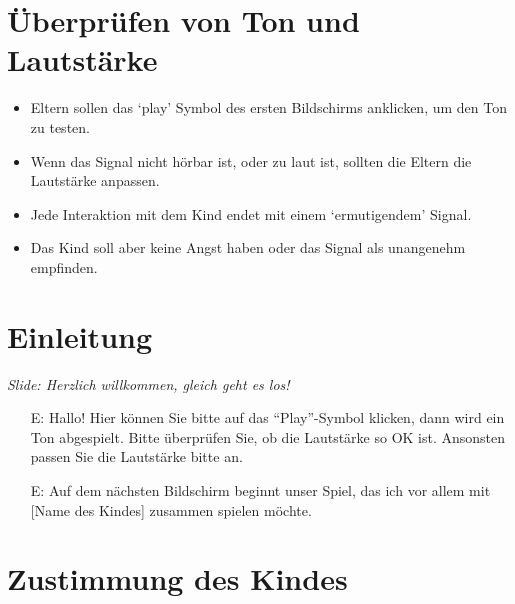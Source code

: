 \documentclass[11pt, oneside]{article}   	%
\begin{document}


\section{\"Uberpr\"ufen von Ton und Lautst\"arke }

\begin{itemize}
\item Eltern sollen das `play' Symbol des ersten Bildschirms anklicken, um den Ton zu testen. 
\item Wenn das Signal nicht h\"orbar ist, oder zu laut ist, sollten die Eltern die Lautst\"arke anpassen. 
\item Jede Interaktion mit dem Kind endet mit einem `ermutigendem' Signal. 
\item Das Kind soll aber keine Angst haben oder das Signal als unangenehm empfinden. 
\end{itemize}


\section{Einleitung} 

{\it Slide: Herzlich willkommen, gleich geht es los!}

\begin{itemize}
\item [E:] Hallo! Hier k\"{o}nnen Sie bitte auf das ``Play''-Symbol klicken, dann wird ein Ton abgespielt. Bitte überprüfen Sie, ob die Lautstärke so OK ist. Ansonsten passen Sie die Lautstärke bitte an.
\item [E:] Auf dem n\"achsten Bildschirm beginnt unser Spiel, das ich  vor allem mit [Name des Kindes] zusammen spielen  m\"ochte. 
\end{itemize}




\section{Zustimmung des Kindes}
\end{document}
